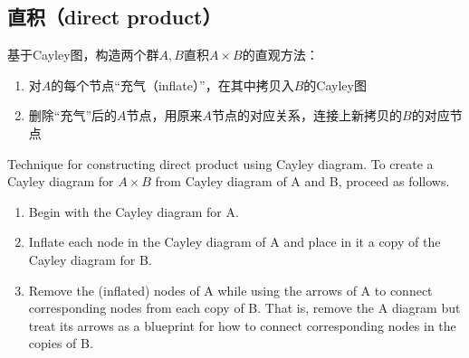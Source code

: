 \documentclass[12pt]{article}
\begin{document}
\subsection{直积（direct product）}
\begin{mdframed}[
linecolor=black!40,outerlinewidth=1pt,roundcorner=.5em,innertopmargin=1ex,innerbottommargin=.5\baselineskip,innerrightmargin=1em,innerleftmargin=1em,backgroundcolor=gray!5,
]
基于Cayley图，构造两个群$A,B$直积$A\times B$的直观方法：
\begin{enumerate}
\setlength{\itemsep}{0pt}
\setlength{\parsep}{0pt}
\setlength{\parskip}{0pt}
	\item 对$A$的每个节点“充气（inflate）”，在其中拷贝入$B$的Cayley图
	\item 删除“充气”后的$A$节点，用原来$A$节点的对应关系，连接上新拷贝的$B$的对应节点
\end{enumerate}

Technique for constructing direct product using Cayley diagram. To create a Cayley diagram for $A \times B$ from Cayley diagram of A and B, proceed as follows.
\begin{enumerate}
\setlength{\itemsep}{0pt}
\setlength{\parsep}{0pt}
\setlength{\parskip}{0pt}
	\item Begin with the Cayley diagram for A.
	\item Inflate each node in the Cayley diagram of A and place in it a copy of the Cayley diagram for B.
	\item Remove the (inflated) nodes of A while using the arrows of A to connect corresponding nodes from each copy of B. That is, remove the A diagram but treat its arrows as a blueprint for how to connect corresponding nodes in the copies of B.
\end{enumerate}
\end{mdframed}
\end{document}
